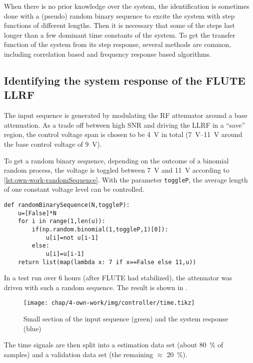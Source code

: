 When there is no prior knowledge over the system, the identification is sometimes done with a (pseudo) random binary sequence to excite the system with step functions of different lengths. Then it is necessary that some of the steps last longer than a few dominant time constants of the system. To get the transfer function of the system from its step response, several methods are common, including correlation based and frequency response based algorithms.

\subsection{Identifying the system response of the FLUTE LLRF}
The input sequence is generated by modulating the RF attenuator around a base attenuation. As a trade off between high SNR and driving the LLRF in a ``save'' region, the control voltage span is chosen to be \SI{4}{\volt} in total (\SIrange{7}{11}{\volt} around the base control voltage of \SI{9}{\volt}).

To get a random binary sequence, depending on the outcome of a binomial random process, the voltage is toggled between \SI{7}{\volt} and \SI{11}{\volt} according to \autoref{lst:own-work-randomSequence}. With the parameter \texttt{toggleP}, the average length of one constant voltage level can be controlled.

\begin{lstlisting}[style=python,caption = Function to get a random binary sequence, label = lst:own-work-randomSequence]
def randomBinarySequence(N,toggleP):
    u=[False]*N
    for i in range(1,len(u)):
        if(np.random.binomial(1,toggleP,1)[0]):
            u[i]=not u[i-1]
        else:
            u[i]=u[i-1]
    return list(map(lambda x: 7 if x==False else 11,u))
\end{lstlisting}

In a test run over 6 hours (after FLUTE had stabilized), the attenuator was driven with such a random sequence. The result is shown in .

\begin{figure}[tb]
	\centering
	\texttt{[image: chap/4-own-work/img/controller/time.tikz]}
	\caption{Small section of the input sequence (green) and the system response (blue)}
	\label{fig:own-work-identify-input}
\end{figure}

The time signals are then split into a estimation data set (about \SI{80}{\percent} of samples) and a validation data set (the remaining $\approx$ \SI{20}{\percent}).

